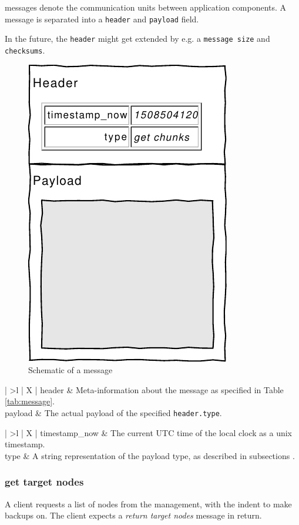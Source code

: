 \Glspl{message} denote the communication units between application components. A \gls{message} is separated into a \texttt{header} and \texttt{payload} field.

In the future, the \texttt{header} might get extended by e.g. a \texttt{message size} and \texttt{checksums}.

\begin{figure}[h]
    \centering
    \includegraphics[width=0.3\linewidth]{resources/message_schematic}
    \caption[\Gls{message} Schematic]{Schematic of a \gls{message}}
    \label{fig:messageschematic}
\end{figure}

\begin{table}[h!]
    \begin{tabu}{| >{\ttfamily}l | X |}
        header
            & Meta-information about the message as specified in Table \ref{tab:message}.\\
        payload
            & The actual payload of the specified \texttt{header.type}.
    \end{tabu}
    \caption[\Gls{message} Structure]{Structure of a \gls{message}.}
    \label{tab:message}
\end{table}

\begin{table}[h!]
    \begin{tabu}{| >{\ttfamily}l | X |}
        timestamp\_now
            & The current UTC time of the local clock as a unix timestamp.  \\
        type
            & A string representation of the payload type, as described in subsections .
    \end{tabu}
    \caption[\Gls{message} Field \texttt{header} Structure]{Structure of the \gls{message} \texttt{header} Field}
    \label{tab:message-field-header}
\end{table}

\subsubsection{get target nodes}
A \gls{client} requests a list of \glspl{node} from the management, with the indent to make backups on. The client expects a \emph{return target nodes} \gls{message} in return.


